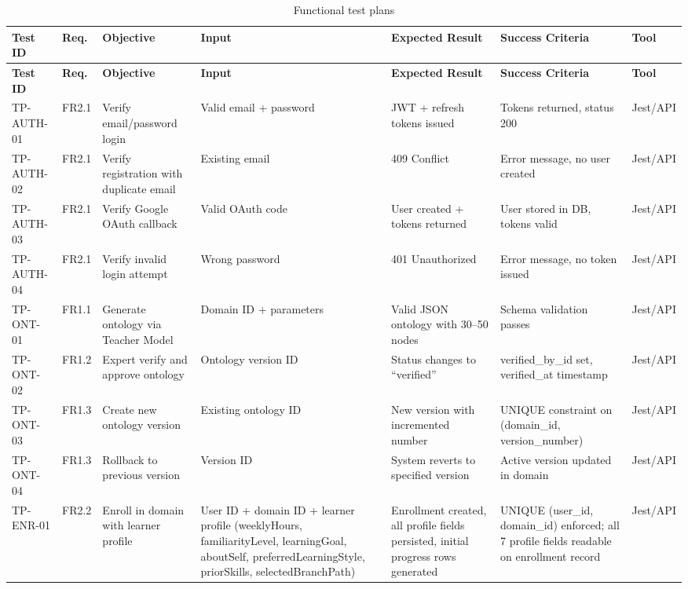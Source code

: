 \begin{longtable}{p{1.8cm}p{1.5cm}p{2.2cm}p{2.2cm}p{2.5cm}p{1.8cm}p{1.2cm}}
\caption{Functional test plans}
\label{tab:func-test-plans}\\
\toprule
\textbf{Test ID} & \textbf{Req.} & \textbf{Objective} & \textbf{Input} & \textbf{Expected Result} & \textbf{Success Criteria} & \textbf{Tool} \\
\midrule
\endfirsthead
\toprule
\textbf{Test ID} & \textbf{Req.} & \textbf{Objective} & \textbf{Input} & \textbf{Expected Result} & \textbf{Success Criteria} & \textbf{Tool} \\
\midrule
\endhead
TP-AUTH-01 & FR2.1 & Verify email/password login & Valid email + password & JWT + refresh tokens issued & Tokens returned, status 200 & Jest/API \\
TP-AUTH-02 & FR2.1 & Verify registration with duplicate email & Existing email & 409 Conflict & Error message, no user created & Jest/API \\
TP-AUTH-03 & FR2.1 & Verify Google OAuth callback & Valid OAuth code & User created + tokens returned & User stored in DB, tokens valid & Jest/API \\
TP-AUTH-04 & FR2.1 & Verify invalid login attempt & Wrong password & 401 Unauthorized & Error message, no token issued & Jest/API \\
TP-ONT-01 & FR1.1 & Generate ontology via Teacher Model & Domain ID + parameters & Valid JSON ontology with 30--50 nodes & Schema validation passes & Jest/API \\
TP-ONT-02 & FR1.2 & Expert verify and approve ontology & Ontology version ID & Status changes to ``verified'' & verified\_by\_id set, verified\_at timestamp & Jest/API \\
TP-ONT-03 & FR1.3 & Create new ontology version & Existing ontology ID & New version with incremented number & UNIQUE constraint on (domain\_id, version\_number) & Jest/API \\
TP-ONT-04 & FR1.3 & Rollback to previous version & Version ID & System reverts to specified version & Active version updated in domain & Jest/API \\
TP-ENR-01 & FR2.2 & Enroll in domain with learner profile & User ID + domain ID + learner profile (weeklyHours, familiarityLevel, learningGoal, aboutSelf, preferredLearningStyle, priorSkills, selectedBranchPath) & Enrollment created, all profile fields persisted, initial progress rows generated & UNIQUE (user\_id, domain\_id) enforced; all 7 profile fields readable on enrollment record & Jest/API \\

\end{longtable}
